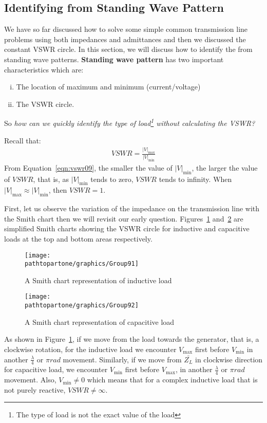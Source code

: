 \subsection{Identifying  from Standing Wave Pattern}\label{lec:lec9}

We have so far discussed how to solve some simple common transmission line problems using both impedances and admittances and then we discussed the constant VSWR circle. In this section, we will discuss how to identify the  from standing wave patterns. \textbf{Standing wave pattern} has two important characteristics which are:
\begin{enumerate}[(i)]
\item The location of maximum and minimum (current/voltage)
\item The VSWR circle.
\end{enumerate}
So \emph{how can we quickly identify the type of load\footnote{The type of load is not the exact value of the load} without calculating the VSWR?}

Recall that:
\begin{align}
VSWR = \frac{|V|_\max}{|V|_\min}
\label{eqn:vswr09}
\end{align}
From Equation~\eqref{eqn:vswr09}, the smaller the value of $|V|_\min$, the larger the value of ${VSWR}$, that is, as $|V|_\min$ tends to zero, ${VSWR}$ tends to infinity. When $|V|_\max{\approx}|V|_\min$, then $VSWR = 1$.

First, let us observe the variation of the impedance on the transmission line with the Smith chart then we will revisit our early question. Figures~\ref{fig:group91} and~\ref{fig:group92} are simplified Smith charts showing the VSWR circle for inductive and capacitive loads at the top and bottom areas respectively.
\begin{figure}[h]
\centering
\texttt{[image: \\pathtopartone/graphics/Group91]}
\caption{A Smith chart representation of inductive load}
\label{fig:group91}
\end{figure}
\begin{figure}[h]
\centering
\texttt{[image: \\pathtopartone/graphics/Group92]}
\caption{A Smith chart representation of capacitive load}
\label{fig:group92}
\end{figure}

As shown in Figure~\ref{fig:group91}, if we move from the load towards the generator, that is, a clockwise rotation, for the inductive load we encounter $V_\max$ first before ${V_\min}$ in another $\frac{\lambda}{4}$ or $\pi rad$ movement. Similarly, if we move from $\bar{Z_L}$ in clockwise direction for capacitive load, we encounter $V_\min$ first before $V_\max$, in another $\frac{\lambda}{4}$ or $\pi rad$ movement. Also, $V_\min\neq0$ which means that for a complex inductive load that is not purely reactive, $VSWR\neq\infty$.

